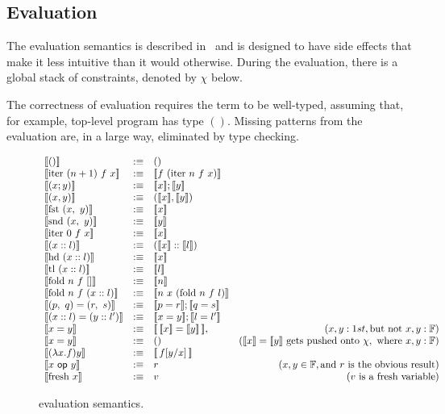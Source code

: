 \documentclass[
    9pt,            
    techreport,       
    affiltop,       
]{art}
\begin{document}
\subsection{Evaluation}\label{sec:current-evaluation}

The evaluation semantics is described in~ and is designed to have side effects that make it less intuitive than it would otherwise. During the evaluation, there is a global stack of constraints, denoted by $\chi$ below. 

The correctness of evaluation requires the term to be well-typed, assuming that, for example, top-level \VampIR{} program has type $()$. Missing patterns from the evaluation are, in a large way, eliminated by type checking. 

\begin{figure}[!htb]
    \centering
\begin{equation*}
\begin{array}{lclr}
    \evalT{ ()} &:\equiv &() &\\
    \evalT{ \text{iter}\ (n+1)\ f\ x} &:\equiv &\evalT{f\ (\text{iter}\ n\ f\ x)} &\\
    \evalT{ (x; y)} &:\equiv &\evalT{x}; \evalT{y} &\\
    \evalT{ (x, y)} &:\equiv &(\evalT{x}, \evalT{y}) &\\
    \evalT{ \text{fst}\ (x,\ y)} &:\equiv &\evalT{x} &\\
    \evalT{ \text{snd}\ (x,\ y)} &:\equiv &\evalT{y} &\\
    \evalT{ \text{iter}\ 0\ f\ x} &:\equiv &\evalT{x} &\\
    \evalT{ (x :: l)} &:\equiv &(\evalT{x} :: \evalT{l})&\\
    \evalT{ \text{hd}\ (x::l)} &:\equiv &\evalT{x} &\\
    \evalT{ \text{tl}\ (x::l)} &:\equiv &\evalT{l} &\\
    \evalT{ \text{fold}\ n\ f\ []} &:\equiv &\evalT{n} &\\
    \evalT{ \text{fold}\ n\ f\ (x::l)} &:\equiv &\evalT{n\ x\ (\text{fold}\ n\ f\ l)} &\\
    \evalT{ (p,\ q) = (r,\ s)} &:\equiv &\evalT{p = r}; \evalT{q = s}\\
    \evalT{ (x :: l ) = (y :: l')} &:\equiv &\evalT{x = y}; \evalT{l = l'}\\
    \evalT{ x = y} &:\equiv &\evalT{\,\evalT{x} = \evalT{y}\,}, &(x, y : 1st, \text{but not}\ x, y : \mathbb{F})\\ 
    \evalT{x = y} &:\equiv &()  &(\evalT{x} = \evalT{y}\ \text{gets pushed onto}\ \chi,\ \text{where}\ x, y : \mathbb{F})\\
    \evalT{ (\lambda x. f) y} &:\equiv &\evalT{\,f[y/x] \, } &\\
    \evalT{x\ \mathsf{op}\ y} &:\equiv &r &(x, y \in \mathbb{F}, \text{and}\ r\ \text{is the obvious result}) \\
    \evalT{ \text{fresh}\ x} &:\equiv &v &(v\ \text{is a fresh variable})
\end{array}
\end{equation*}
    \caption{\VampIR{} evaluation semantics.}
    \label{fig:enter-label}
\end{figure}
\end{document}
